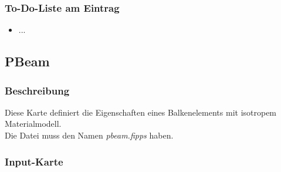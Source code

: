 \documentclass[11pt,titlepage,listof=totoc,bibliography=totoc,twoside]{scrreprt}
\begin{document}
{{\subsubsection{To-Do-Liste am Eintrag}

\begin{itemize}
\item ...
\end{itemize}

\newpage

\subsection{PBeam}

\subsubsection{Beschreibung}

Diese Karte definiert die Eigenschaften eines Balkenelements mit isotropem Materialmodell.\\
Die Datei muss den Namen \emph{pbeam.fipps} haben.

\subsubsection{Input-Karte}

}}
\end{document}
